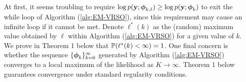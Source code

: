 
At first, it seems troubling to require $\log p(\mathbf{y};\boldsymbol{\phi}_{k,\ell}) \geq \log p(\mathbf{y};\boldsymbol{\phi}_{k})$ to exit the while loop of Algorithm (\ref{alg:EM-VRSO}), since this requirement may cause an infinite loop if it cannot be met. %
Denote $\ell^*(k)$ as the (random) maximum value obtained by $\ell$ within Algorithm (\ref{alg:EM-VRSO}) for a given value of $k$. We prove in Theorem 1 below that 
$\mathbb{P}(\ell^*(k) < \infty) = 1$. %
%
One final concern is whether the sequence $\{\boldsymbol{\phi}_{k}\}_{k=0}^\infty$ generated by Algorithm (\ref{alg:EM-VRSO}) converges to a local maximum of the likelihood as $K \to \infty$. %
Theorem 1 below guarantees convergence under standard regularity conditions. %

    
